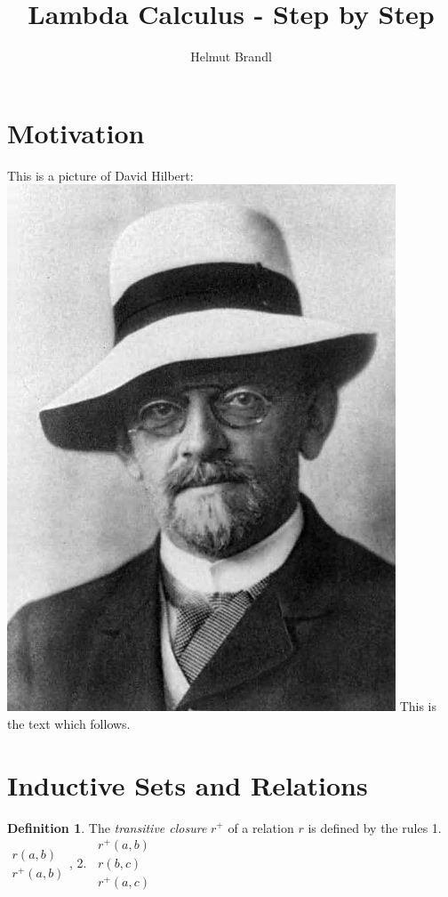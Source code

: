 \documentclass{article}
\title{Lambda Calculus - Step by Step}
\author{Helmut Brandl}
\date{}
\newcommand{\rplus}[1]{#1^+}
\newcommand{\rulev}[2]{\begin{array}{l} #1 \\ \hline #2\end{array}}
\begin{document}
\maketitle

\tableofcontents

\theoremstyle{definition} \newtheorem{definition}{Definition}[section]
\theoremstyle{definition} \newtheorem{theorem}{Theorem}[section]
\theoremstyle{definition} \newtheorem{lemma}{Lemma}[section]

\section{Motivation}

This is a picture of David
Hilbert:\includegraphics[scale=0.2,angle=90]{../img/hilbert.jpg} This is the text
which follows.


\section{Inductive Sets and Relations}


\begin{definition} The \emph{transitive closure} $\rplus{r}$ of a relation $r$ is
  defined by the rules
1.~$\rulev{r(a,b)}{\rplus{r}(a,b)}$,
2.~$\rulev{\rplus{r}(a,b) \\ r(b,c)}{\rplus{r}(a,c)}$
\end{definition}
\end{document}
